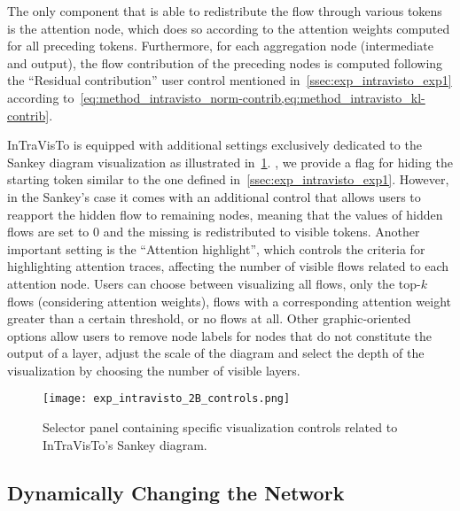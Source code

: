 The only component that is able to redistribute the flow through various tokens is the attention node, which does so according to the attention weights computed for all preceding tokens.
Furthermore, for each aggregation node (intermediate and output), the flow contribution of the preceding nodes is computed following the ``Residual contribution'' user control mentioned in~\cref{ssec:exp_intravisto_exp1} according to~\cref{eq:method_intravisto_norm-contrib,eq:method_intravisto_kl-contrib}.

InTraVisTo is equipped with additional settings exclusively dedicated to the Sankey diagram visualization as illustrated in~\cref{fig:exp_intravisto_2_B}.
, we provide a flag for hiding the starting token similar to the one defined in~\cref{ssec:exp_intravisto_exp1}.
However, in the Sankey's case it comes with an additional control that allows users to reapport the hidden flow to remaining nodes, meaning that the values of hidden flows are set to $0$ and the missing  is redistributed to visible tokens.
Another important setting is the ``Attention highlight'', which controls the criteria for highlighting attention traces, affecting the number of visible flows related to each attention node.
Users can choose between visualizing all flows, only the top-$k$ flows (considering attention weights),  flows with a corresponding attention weight greater than a certain threshold, or no flows at all.
Other graphic-oriented options allow users to remove node labels for nodes that do not constitute the output of a layer, adjust the scale of the diagram and select the depth of the visualization by choosing the number of visible layers.

\begin{figure}[t!]
    \centering
    \texttt{[image: exp\_intravisto\_2B\_controls.png]}
    \caption{Selector panel containing specific visualization controls related to InTraVisTo's Sankey diagram.}
    \label{fig:exp_intravisto_2_B}
\end{figure}

\subsection{Dynamically Changing the Network}\label{ssec:exp_intravisto_exp3}


